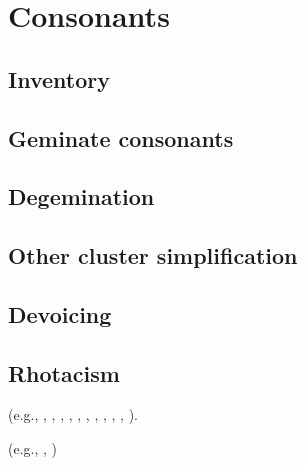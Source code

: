 \chapter{Consonants}

\section{Inventory}

\citet{Allen1978}

\citet{Steriade1995}

\section{Geminate consonants}


\section{Degemination}

\section{Other cluster simplification}

\citet{Heslin1987}

\section{Devoicing}

\citet{Allen1978}

\section{Rhotacism}

\citet{Saussure1877}

\citet[213f.]{Baldi2002}

(e.g., \citealt{Albright2005}, \citealt[62]{Foley1965}, \citealt{Gruber2006}, \citealt[134]{Heslin1987}, \citealt[377]{Kenstowicz1996}, \citealt{KiparskyInPress}, \citealt[314]{Klausenburger1976}, \citealt[19]{Matthews1972a}, \citealt{Roberts2012}, \citealt{Touratier1975}, \citealt{Watkins1970}).

(e.g., \citealt[73]{Embick2010}, \citealt{Halle1998a})

